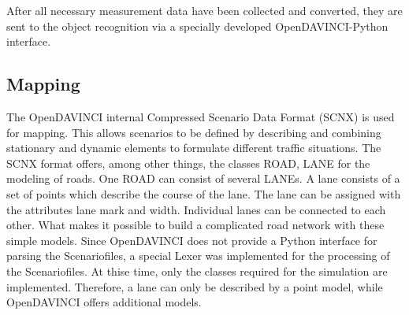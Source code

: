 \documentclass[11pt,oneside,openright]{mpreport}
\begin{document}
After all necessary measurement data have been collected and converted, they are sent to the object recognition via a specially developed OpenDAVINCI-Python interface.

\subsection{Mapping}
The OpenDAVINCI internal Compressed Scenario Data Format (SCNX) \cite{Berger2010} is used for mapping. This allows scenarios to be defined by describing and combining stationary and dynamic elements
to formulate different traffic situations. The SCNX format offers, among other things, the classes ROAD, LANE for the modeling of roads. One ROAD can consist of several LANEs.
A lane consists of a set of points which describe the course of the lane. The lane can be assigned with the attributes lane mark and width. 
Individual lanes can be connected to each other. What makes it possible to build a complicated road network with these simple models. 
Since OpenDAVINCI does not provide a Python interface for parsing the Scenariofiles, a special Lexer was implemented for the processing of the Scenariofiles. 
At thise time, only the classes required for the simulation are implemented. Therefore, a lane can only be described by a point model, while OpenDAVINCI offers additional models.
\end{document}
